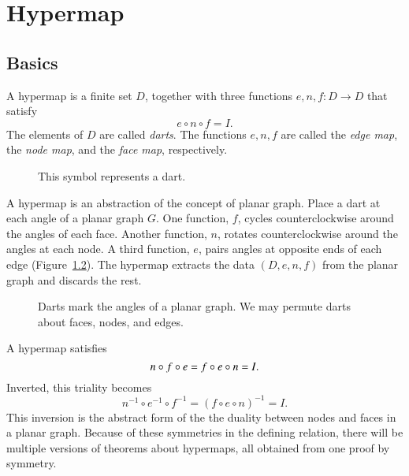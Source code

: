 
\chapter{Hypermap}\label{chap:hypermap}

\section{Basics}



\begin{definition}[hypermap]\label{def:hypermap}  A hypermap is a finite set $D$, together with
three functions $e,n,f:D\to D$ that satisfy
    $$e\circ n\circ f = I.$$
The elements of $D$ are called {\it darts}.  The functions $e,n,f$
are called the {\it edge map}, the {\it node map}, and the {\it
face map}, respectively.
\end{definition}


\begin{figure}[htb]
  \centering
  \caption{This symbol represents a dart.}
  \label{fig:dart}
\end{figure}

\begin{remark} A hypermap is an abstraction of
the concept of 
planar graph.  Place a dart at each angle of a planar graph $G$.
One function, $f$, 
cycles counterclockwise around the angles of each face.  
Another function, $n$, 
rotates counterclockwise around the angles at each
node.  A third function, $e$, pairs angles at opposite ends of
each edge  (Figure~\ref{fig:hypermap_ex}).   The hypermap extracts
the data $(D,e,n,f)$ from the planar graph and discards the rest.
\end{remark}

\begin{figure}[htb]
  \centering
  \caption{Darts mark the angles of a planar graph.  We may
  permute darts about faces, nodes, and edges.}
  \label{fig:hypermap_ex}
\end{figure}

A hypermap satisfies 
  \begin{equation}\tlabel{eqn:triality}
  n\circ f\circ e = f\circ e\circ n = I.
  \end{equation}
Inverted, this triality becomes
   $$
   n^{-1} \circ e^{-1} \circ f^{-1} = (f \circ e \circ n)^{-1} = I.
   $$
This inversion
is the abstract form of the
the duality between nodes and faces in a planar graph.  
Because of
these symmetries in the defining relation, 
there will be multiple versions of 
theorems about hypermaps,
all obtained from one proof by symmetry.

